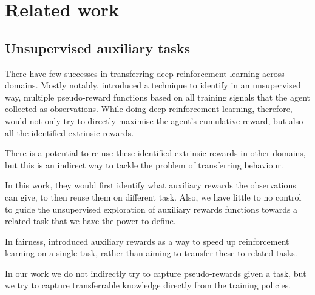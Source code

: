 


\section{Related work}
\subsection{Unsupervised auxiliary tasks}
There have few successes in transferring deep reinforcement learning across domains. Mostly notably, \cite{jaderberg2016reinforcement} introduced a technique to identify in an unsupervised way, multiple pseudo-reward functions based on all training signals that the agent collected as observations. While doing deep reinforcement learning, therefore, \citeauthor{jaderberg2016reinforcement} would not only try to directly maximise the agent's cumulative reward, but also all the identified extrinsic rewards. 

There is a potential to re-use these identified extrinsic rewards in other domains, but this is an indirect way to tackle the problem of transferring behaviour. 

In this work, they would first identify what auxiliary rewards the observations can give, to then reuse them on different task. Also, we have little to no control to guide the unsupervised exploration of auxiliary rewards functions towards a related task that we have the power to define.

In fairness, \citeauthor{jaderberg2016reinforcement} introduced auxiliary rewards as a way to speed up reinforcement learning on a single task, rather than aiming to transfer these to related tasks.

In our work we do not indirectly try to capture pseudo-rewards given a task, but we try to capture transferrable knowledge directly from the training policies.


